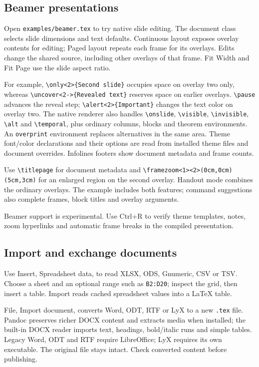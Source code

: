 \documentclass[11pt]{article}
\begin{document}
\subsection{Beamer presentations}
Open \texttt{examples/beamer.tex} to try native slide editing. The document class
selects slide dimensions and text defaults. Continuous layout exposes overlay
contents for editing; Paged layout repeats each frame for its overlays. Edits
change the shared source, including other overlays of that frame. Fit Width and
Fit Page use the slide aspect ratio.

For example, \verb|\only<2>{Second slide}| occupies space on overlay two only,
whereas \verb|\uncover<2->{Revealed text}| reserves space on earlier overlays.
\verb|\pause| advances the reveal step; \verb|\alert<2>{Important}| changes the
text color on overlay two. The native renderer also handles \verb|\onslide|,
\verb|\visible|, \verb|\invisible|, \verb|\alt| and \verb|\temporal|, plus ordinary
columns, blocks and theorem environments. An \texttt{overprint} environment
replaces alternatives in the same area. Theme font/color declarations and their
options are read from installed theme files and document overrides. Infolines
footers show document metadata and frame counts.

Use \verb|\titlepage| for document metadata and \verb|\framezoom<1><2>(0cm,0cm)(5cm,3cm)|
for an enlarged region on the second overlay. Handout mode combines the ordinary
overlays. The example includes both features; command suggestions also complete
frames, block titles and overlay arguments.

Beamer support is experimental. Use Ctrl+R to verify theme templates, notes,
zoom hyperlinks and automatic frame breaks in the compiled presentation.

\subsection{Import and exchange documents}
Use Insert, Spreadsheet data, to read XLSX, ODS, Gnumeric, CSV or TSV. Choose
a sheet and an optional range such as \texttt{B2:D20}; inspect the grid, then
insert a table. Import reads cached spreadsheet values into a LaTeX table.

File, Import document, converts Word, ODT, RTF or LyX to a new \texttt{.tex} file.
Pandoc preserves richer DOCX content and extracts media when installed; the
built-in DOCX reader imports text, headings, bold/italic runs and simple tables.
Legacy Word, ODT and RTF require LibreOffice; LyX requires its own executable.
The original file stays intact. Check converted content before publishing.
\end{document}

